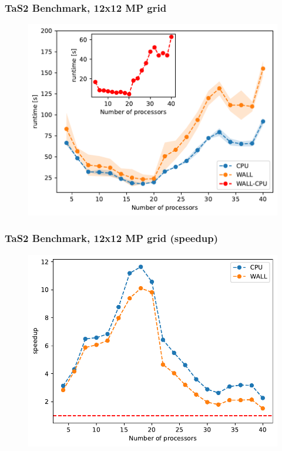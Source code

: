 \documentclass{beamer}
\begin{document}
\begin{frame}
    \frametitle{TaS2 Benchmark, 12x12 MP grid}
    \begin{figure}
        \includegraphics[width=\linewidth, height=\textheight,keepaspectratio]{TaS2_bench_nprocs_12x12.pdf}
    \end{figure}
\end{frame}

\begin{frame}
    \frametitle{TaS2 Benchmark, 12x12 MP grid (speedup)}
    \begin{figure}
        \includegraphics[width=\linewidth, height=\textheight,keepaspectratio]{TaS2_bench_nprocs_12x12_speedup.pdf}
    \end{figure}
\end{frame}
\end{document}
